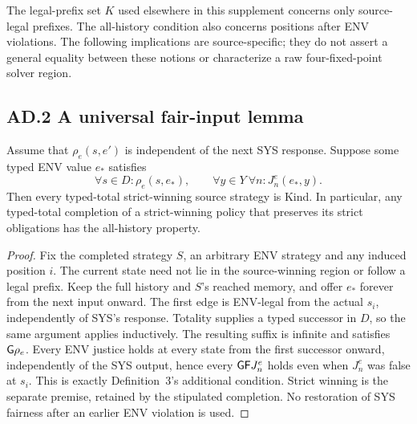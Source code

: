 The legal-prefix set $K$ used elsewhere in this supplement concerns only
source-legal prefixes. The all-history condition also concerns positions after
ENV violations. The following implications are source-specific; they do not
assert a general equality between these notions or characterize a raw
four-fixed-point solver region.

\subsection*{AD.2 A universal fair-input lemma}
\begin{lemma}
\label{supp:r7-universal-fair-input}
Assume that $\rho_e(s,e')$ is independent of the next SYS response.
Suppose some typed ENV value $e_*$ satisfies
\[
 \forall s\in D:\rho_e(s,e_*),
 \qquad
 \forall y\in Y\ \forall n:J^e_n(e_*,y).
\]
Then every typed-total strict-winning source strategy is Kind.
In particular, any typed-total completion of a strict-winning policy that
preserves its strict obligations has the all-history property.
\end{lemma}
\begin{proof}
Fix the completed strategy $S$, an arbitrary ENV strategy and any induced
position $i$. The current state need not lie in the source-winning region or
follow a legal prefix. Keep the full history and $S$'s reached memory, and
offer $e_*$ forever from the next input onward. The first edge is ENV-legal
from the actual $s_i$, independently of SYS's response. Totality supplies a
typed successor in $D$, so the same argument applies inductively.
The resulting suffix is infinite and satisfies $\mathsf{G}\rho_e$.
Every ENV justice holds at every state from the first successor onward,
independently of the SYS output, hence every $\mathsf{G}\mathsf{F} J^e_n$ holds even when
$J^e_n$ was false at $s_i$.
This is exactly Definition~3's additional condition. Strict winning is the
separate premise, retained by the stipulated completion. No restoration of
SYS fairness after an earlier ENV violation is used.
\end{proof}

